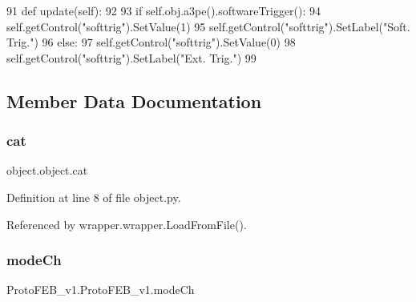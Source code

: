 \begin{DoxyCode}
91     \textcolor{keyword}{def }update(self):
92 
93         \textcolor{keywordflow}{if} self.obj.a3pe().softwareTrigger():
94             self.getControl(\textcolor{stringliteral}{"softtrig"}).SetValue(1)
95             self.getControl(\textcolor{stringliteral}{"softtrig"}).SetLabel(\textcolor{stringliteral}{"Soft. Trig."})
96         \textcolor{keywordflow}{else}:
97             self.getControl(\textcolor{stringliteral}{"softtrig"}).SetValue(0)
98             self.getControl(\textcolor{stringliteral}{"softtrig"}).SetLabel(\textcolor{stringliteral}{"Ext. Trig."})
99 
\end{DoxyCode}


\subsection{Member Data Documentation}
\mbox{\label{classobject_1_1object_af114388a80cca208c152ffeca0e89e23}} 
\subsubsection{\texorpdfstring{cat}{cat}}
{\footnotesize\ttfamily object.\+object.\+cat\hspace{0.3cm}{\ttfamily [inherited]}}



Definition at line 8 of file object.\+py.



Referenced by wrapper.\+wrapper.\+Load\+From\+File().

\mbox{\label{classProtoFEB__v1_1_1ProtoFEB__v1_acd03f62f5c3c9829f4f0c7407735e352}} 
\subsubsection{\texorpdfstring{mode\+Ch}{modeCh}}
{\footnotesize\ttfamily Proto\+F\+E\+B\+\_\+v1.\+Proto\+F\+E\+B\+\_\+v1.\+mode\+Ch}



